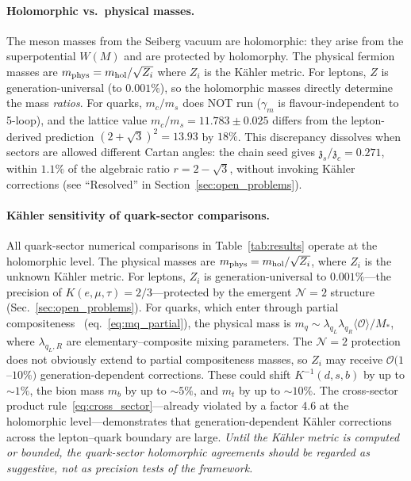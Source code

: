 \documentclass[aps,prd,twocolumn,showpacs,preprintnumbers,superscriptaddress,floatfix]{revtex4-2}
\newcommand{\zch}{\mathfrak{z}}
\begin{document}
\paragraph{Holomorphic vs.\ physical masses.}
The meson masses from the Seiberg vacuum are holomorphic: they
arise from the superpotential $W(M)$ and are protected by
holomorphy.
The physical fermion masses are $m_{\rm phys} = m_{\rm hol}/\sqrt{Z_i}$
where $Z_i$ is the K\"ahler metric.
For leptons, $Z$ is generation-universal (to $0.001\%$), so the
holomorphic masses directly determine the mass \emph{ratios}.
For quarks, $m_c/m_s$ does NOT run ($\gamma_m$ is
flavour-independent to 5-loop), and the lattice value
$m_c/m_s = 11.783 \pm 0.025$ differs from the lepton-derived
prediction $(2+\sqrt{3})^2 = 13.93$ by $18\%$.
This discrepancy dissolves when sectors are allowed different
Cartan angles: the chain seed gives
$\zch_s/\zch_c = 0.271$, within $1.1\%$ of the algebraic
ratio $r = 2 - \sqrt{3}$, without invoking K\"ahler
corrections (see ``Resolved'' in
Section~\ref{sec:open_problems}).

\paragraph{K\"ahler sensitivity of quark-sector comparisons.}
All quark-sector numerical comparisons in
Table~\ref{tab:results} operate at the holomorphic level.
The physical masses are $m_{\rm phys} = m_{\rm hol}/\sqrt{Z_i}$,
where $Z_i$ is the unknown K\"ahler metric.
For leptons, $Z_i$ is generation-universal to $0.001\%$---the
precision of $K(e,\mu,\tau) = 2/3$---protected by the emergent
$\mathcal{N}{=}2$ structure (Sec.~\ref{sec:open_problems}).
For quarks, which enter through partial
compositeness~\cite{Kaplan:1991dc}
(eq.~\ref{eq:mq_partial}), the physical mass is
$m_q \sim \lambda_{q_L}\lambda_{q_R}\langle\mathcal{O}\rangle/M_*$,
where $\lambda_{q_L,R}$ are elementary--composite mixing
parameters.
The $\mathcal{N}{=}2$ protection does not obviously extend to
partial compositeness masses, so $Z_i$ may receive
$\mathcal{O}(1$--$10\%)$ generation-dependent corrections.
These could shift $K^{-1}(d,s,b)$ by up to $\sim\!1\%$, the bion
mass $m_b$ by up to $\sim\!5\%$, and $m_t$ by up to
$\sim\!10\%$.
The cross-sector product
rule~\eqref{eq:cross_sector}---already violated by a factor 4.6
at the holomorphic level---demonstrates that
generation-dependent K\"ahler corrections across the
lepton--quark boundary are large.
\emph{Until the K\"ahler metric is computed or bounded, the
quark-sector holomorphic agreements should be regarded as
suggestive, not as precision tests of the framework.}
\end{document}
